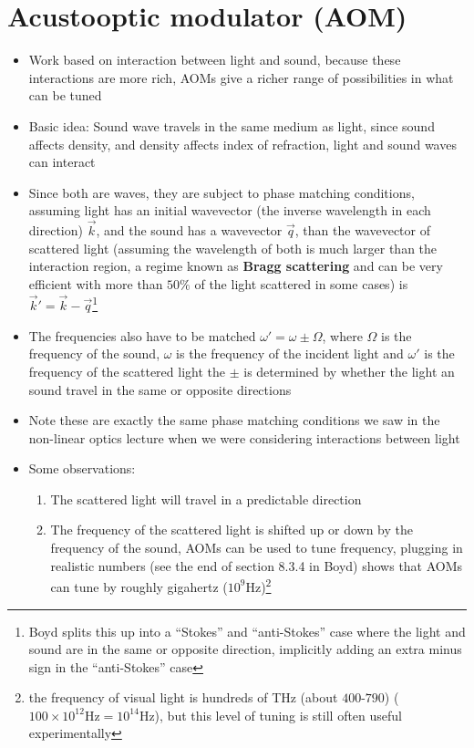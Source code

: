 \documentclass[english]{article}
\begin{document}
\section{Acustooptic modulator (AOM)}

\begin{itemize}
\item Work based on interaction between light and sound, because these interactions are more rich, AOMs give a richer range of possibilities in what can be tuned
\item Basic idea: Sound wave travels in the same medium as light, since sound affects density, and density affects index of refraction, light and sound waves can interact
\item Since both are waves, they are subject to phase matching conditions, assuming light has an initial wavevector (the inverse wavelength in each direction) $\vec{k}$, and the sound has a wavevector $\vec{q}$, than the wavevector of scattered light (assuming the wavelength of both is much larger than the interaction region, a regime known as \textbf{Bragg scattering} and can be very efficient with more than $50\%$ of the light scattered in some cases) is $\vec{k}'=\vec{k}-\vec{q}$\footnote{Boyd splits this up into a ``Stokes'' and ``anti-Stokes'' case where the light and sound are in the same or opposite direction, implicitly adding an extra minus sign in the ``anti-Stokes'' case}
\item The frequencies also have to be matched $\omega'=\omega\pm \Omega$, where $\Omega$ is the frequency of the sound, $\omega$ is the frequency of the incident light and $\omega'$ is the frequency of the scattered light the $\pm$ is determined by whether the light an sound travel in the same or opposite directions
\item Note these are exactly the same phase matching conditions we saw in the non-linear optics lecture when we were considering interactions between light
\item Some observations:
\begin{enumerate}
\item The scattered light will travel in a predictable direction
\item The frequency of the scattered light is shifted up or down by  the frequency of the sound, AOMs can be used to tune frequency, plugging in realistic numbers (see the end of section 8.3.4 in Boyd) shows that AOMs can tune by roughly gigahertz ($10^9 \mathrm{Hz}$)\footnote{the frequency of visual light is hundreds of THz (about $400$-$790$) ($100\times 10^{12}\mathrm{Hz}=10^{14}\mathrm{Hz}$), but this level of tuning is still often useful experimentally}

\end{enumerate}
\end{itemize}
\end{document}
